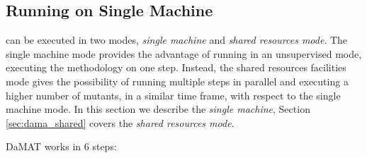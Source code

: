 \subsection{Running \DAMA on Single Machine}
\label{sec:dama_singlelaunch}


\DAMA can be executed in two modes, \emph{single machine} and \emph{shared resources mode}. The single machine mode provides the advantage of running \DAMA in an unsupervised mode, executing the methodology on one step. Instead, the shared resources facilities mode gives the possibility of running multiple steps in parallel and executing a higher number of mutants, in a similar time frame, with respect to the single machine mode. In this section we describe the \emph{single machine}, Section \ref{sec:dama_shared} covers the \emph{shared resources mode}.

DaMAT works in 6 steps:

